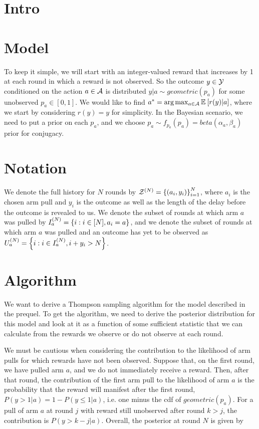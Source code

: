 \documentclass{article}
\begin{document}
\section{Intro} \label{sec:intro}
\section{Model} \label{sec:model}

To keep it simple, we will start with an integer-valued reward that increases by 1 at each round in which a reward is not observed. So the outcome $y \in \mathcal{Y}$ conditioned on the action $a \in \mathcal{A}$ is distributed $y | a \sim geometric(p_a)$ for some unobserved $p_a \in [0,1]$. We would like to find $a^* = \textnormal{arg} \max_{a \in \mathcal{A}} \mathbb{E}_{} \left[ r(y) | a \right]$, where we start by considering $r(y) = y$ for simplicity. In the Bayesian scenario, we need to put a prior on each $p_a$, and we choose $p_a \sim f_{p_a}(p_a) = beta(\alpha_a, \beta_a)$ prior for conjugacy.

\section{Notation} \label{subsec:notation}
We denote the full history for $N$ rounds by $\mathcal{Z}^{(N)} = \left \{ (a_i, y_i) \right \}_{i=1}^N$, where $a_i$ is the chosen arm pull and $y_i$ is the outcome as well as the length of the delay before the outcome is revealed to us. We denote the subset of rounds at which arm $a$ was pulled by $I_a^{(N)} = \left \{ i: i \in [N], a_i = a \right \}$, and we denote the subset of rounds at which arm $a$ was pulled and an outcome has yet to be observed as $U_a^{(N)} = \left \{ i : i \in I_a^{(N)}, i + y_i > N \right \}$.

\section{Algorithm} \label{sec:alg}
We want to derive a Thompson sampling algorithm for the model described in the prequel. To get the algorithm, we need to derive the posterior distribution for this model and look at it as a function of some sufficient statistic that we can calculate from the rewards we observe or do not observe at each round. 

We must be cautious when considering the contribution to the likelihood of arm pulls for which rewards have not been observed. Suppose that, on the first round, we have pulled arm $a$, and we do not immediately receive a reward. Then, after that round, the contribution of the first arm pull to the likelihood of arm $a$ is the probability that the reward will manifest after the first round, $P(y > 1 | a) = 1 - P(y \leq 1 | a)$, i.e. one minus the cdf of $geometric(p_a)$. For a pull of arm $a$ at round $j$ with reward still unobserved after round $k > j$, the contribution is $P(y > k - j | a)$. Overall, the posterior at round $N$ is given by
\end{document}
